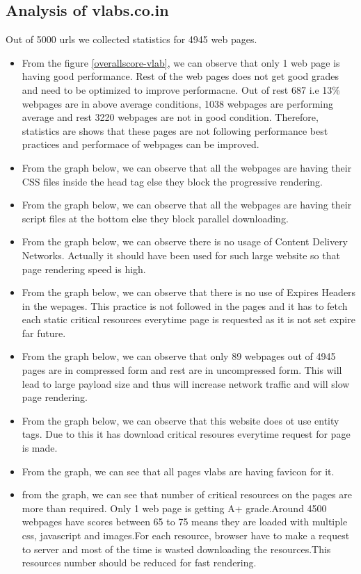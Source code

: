 \documentclass[conference]{IEEEtran}
\begin{document}
\subsection{Analysis of vlabs.co.in}
 Out of 5000 urls we collected statistics for 4945 web pages.
\begin{itemize}
\item From the figure \ref{overallscore-vlab}, we can observe that only 1 web page is having good
performance. Rest of the web pages does not get good grades and need to be
optimized to improve performacne. Out of rest 687 i.e 13\% webpages are in above average conditions, 1038
webpages are performing average and rest 3220 webpages are not in good
condition. Therefore, statistics are shows that these pages are not following
performance best practices and performace of webpages can be improved.  
 
\item From the graph below, we can observe that all the webpages are having their
CSS files inside the head tag else they block the progressive rendering.

\item From the graph below, we can observe that all the webpages are having their
script files at the bottom else they block parallel downloading.

\item From the graph below, we can observe there is no usage of Content Delivery
Networks. Actually it should have been used for such large website so that page
rendering speed is high.

\item From the graph below, we can observe that there is no use of Expires
Headers in the wepages. This practice is not followed in the pages and it has to
fetch each static critical resources everytime page is requested as it is not
set expire far future.

\item From the graph below, we can observe that only 89 webpages out of 4945
pages are in compressed form and rest are in uncompressed form. This will lead to
large payload size and thus will increase network traffic and will slow page
rendering.
\item From the graph below, we can observe that this website does ot use entity
tags. Due to this it has download critical resoures everytime request for page is
made.
\item From the graph, we can see that all pages vlabs are having favicon for it.
\item from the graph, we can see that number of critical resources  on the pages
are more than required. Only 1 web page is getting A+ grade.Around 4500 webpages
have scores between 65 to 75 means they are loaded with multiple css, javascript
and images.For each resource, browser have to make a request to server and most
of the time is wasted downloading the resources.This resources  number should be
reduced for fast rendering.
\end{itemize}
\end{document}
